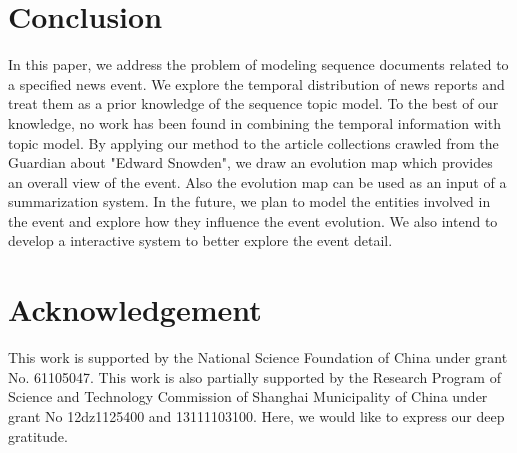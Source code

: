 \documentclass[runningheads,a4paper]{llncs}
\begin{document}
\section{Conclusion}
\label{conclusion}
In this paper, we address the problem of modeling sequence documents related to a specified news event. We explore the temporal distribution of news reports and treat them as a prior knowledge of the sequence topic model. To the best of our knowledge, no work has been found in combining the temporal information with topic model. By applying our method to the article collections crawled from the Guardian about "Edward Snowden", we draw an evolution map which provides an overall view of the event. Also the evolution map can be used as an input of a summarization system. In the future, we plan to model the entities involved in the event and explore how they influence the event evolution. We also intend to develop a interactive system to better explore the event detail.

\section*{Acknowledgement}
This work is supported by the National Science Foundation of China under grant No. 61105047. This work is also partially supported by the Research Program of Science and Technology Commission of Shanghai Municipality of China under grant No 12dz1125400 and 13111103100. Here, we would like to express our deep gratitude.

 

\end{document}
